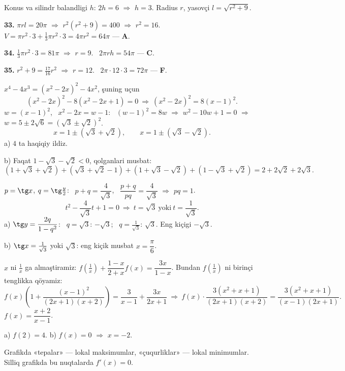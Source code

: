 \newpage
{}
Konus va silindr balandligi $h$: $2h=6$ $\Rightarrow$ $h=3$. Radius $r$, yasovçi $l=\sqrt{r^2+9}$.

\textbf{33.} $\pi rl=20\pi$ $\Rightarrow$ $r^2\left(r^2+9\right)=400$ $\Rightarrow$ $r^2=16$. \ $V=\pi r^2\cdot3+\frac13\pi r^2\cdot3=4\pi r^2=64\pi$ — \textbf{A}.

\textbf{34.} $\frac13\pi r^2\cdot3=81\pi$ $\Rightarrow$ $r=9$. \ $2\pi rh=54\pi$ — \textbf{C}.

\textbf{35.} $r^2+9=\frac{17}{16}r^2$ $\Rightarrow$ $r=12$. \ $2\pi\cdot12\cdot3=72\pi$ — \textbf{F}.

\newpage
{}
$x^4-4x^3=\left(x^2-2x\right)^2-4x^2$, şuning uçun
\[\left(x^2-2x\right)^2-8\left(x^2-2x+1\right)=0\ \Rightarrow\ \left(x^2-2x\right)^2=8(x-1)^2.\]
$w=(x-1)^2$, \ $x^2-2x=w-1$: \ $(w-1)^2=8w$ $\Rightarrow$ $w^2-10w+1=0$ $\Rightarrow$ $w=5\pm2\sqrt6=\left(\sqrt3\pm\sqrt2\right)^2$.
\[x=1\pm\left(\sqrt3+\sqrt2\right),\qquad x=1\pm\left(\sqrt3-\sqrt2\right).\]
a) $4$ ta haqiqiy ildiz.

b) Faqat $1-\sqrt3-\sqrt2<0$, qolganlari musbat:
\[\left(1+\sqrt3+\sqrt2\right)+\left(\sqrt3+\sqrt2-1\right)+\left(1+\sqrt3-\sqrt2\right)+\left(1-\sqrt3+\sqrt2\right)=2+2\sqrt2+2\sqrt3.\]

\newpage
{}
$p=\tg x$, $q=\tg\frac y2$: \ $p+q=\dfrac4{\sqrt3}$, \ $\dfrac{p+q}{pq}=\dfrac4{\sqrt3}$ $\Rightarrow$ $pq=1$.
\[t^2-\frac4{\sqrt3}t+1=0\ \Rightarrow\ t=\sqrt3\ \text{yoki}\ t=\frac1{\sqrt3}.\]
a) $\tg y=\dfrac{2q}{1-q^2}$: \ $q=\sqrt3$: $-\sqrt3$; \ $q=\frac1{\sqrt3}$: $\sqrt3$. Eng kiçigi $-\sqrt3$.

b) $\tg x=\frac1{\sqrt3}$ yoki $\sqrt3$: eng kiçik musbat $x=\dfrac\pi6$.

\newpage
{}
$x$ ni $\frac1x$ ga almaştiramiz: $f\left(\frac1x\right)+\dfrac{1-x}{2+x}f(x)=\dfrac{3x}{1-x}$. Bundan $f\left(\frac1x\right)$ ni birinçi tenglikka qöyamiz:
\[f(x)\left(1+\frac{(x-1)^2}{(2x+1)(x+2)}\right)=\frac3{x-1}+\frac{3x}{2x+1}\ \Rightarrow\ f(x)\cdot\frac{3\left(x^2+x+1\right)}{(2x+1)(x+2)}=\frac{3\left(x^2+x+1\right)}{(x-1)(2x+1)}.\]
$f(x)=\dfrac{x+2}{x-1}$.

a) $f(2)=4$. \quad b) $f(x)=0$ $\Rightarrow$ $x=-2$.

\newpage
{}
Grafikda «tepalar» — lokal maksimumlar, «çuqurliklar» — lokal minimumlar. Silliq grafikda bu nuqtalarda $f'(x)=0$.

